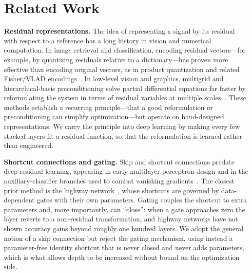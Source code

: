 \section{Related Work}
\label{sec:related}

\noindent\textbf{Residual representations.}
The idea of representing a signal by its residual with respect to a reference has a long
history in vision and numerical computation. In image retrieval and classification,
encoding residual vectors---for example, by quantizing residuals relative to a
dictionary---has proven more effective than encoding original vectors, as in product
quantization and related Fisher/VLAD encodings~\citep{jegou2011pq}. In low-level vision
and graphics, multigrid and hierarchical-basis preconditioning solve partial
differential equations far faster by reformulating the system in terms of residual
variables at multiple scales~\citep{briggs2000multigrid,szeliski2006preconditioning}.
These methods establish a recurring principle---that a good reformulation or
preconditioning can simplify optimization---but operate on hand-designed
representations. We carry the principle into deep learning by making every few stacked
layers fit a residual function, so that the reformulation is learned rather than
engineered.

\noindent\textbf{Shortcut connections and gating.}
Skip and shortcut connections predate deep residual learning, appearing in early
multilayer-perceptron design and in the auxiliary-classifier branches used to combat
vanishing gradients~\citep{lee2014dsn}. The closest prior method is the highway
network~\citep{srivastava2015highway,srivastava2015trainingverydeep}, whose shortcuts
are governed by data-dependent gates with their own parameters. Gating couples the
shortcut to extra parameters and, more importantly, can ``close'': when a gate
approaches zero the layer reverts to a non-residual transformation, and highway networks
have not shown accuracy gains beyond roughly one hundred layers. We adopt the general
notion of a skip connection but reject the gating mechanism, using instead a
parameter-free identity shortcut that is never closed and never adds parameters, which
is what allows depth to be increased without bound on the optimization side.

